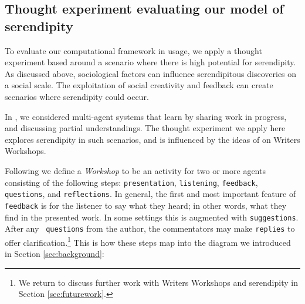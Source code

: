 \subsection{Thought experiment evaluating our model of serendipity} \label{sec:ww}

To evaluate our computational framework in usage, we apply a thought
experiment based around a scenario where there is high potential for
serendipity.  As discussed above, sociological factors can influence
serendipitous discoveries on a social scale.  The exploitation of
social creativity and feedback can create scenarios where serendipity
could occur.

In \cite{poetry-workshop}, we considered multi-agent systems that
learn by sharing work in progress, and discussing partial
understandings.  The thought experiment we apply here explores
serendipity in such scenarios, and is influenced by the ideas of
 on Writers Workshops.

Following 
we define a \emph{Workshop} to be an activity for two or more agents
consisting of the following steps:
{\tt presentation}, {\tt listening}, {\tt feedback}, {\tt questions},
and {\tt reflections}.  In general, the first and most important
feature of {\tt feedback} is for the listener to say what they heard;
in other words, what they find in the presented work.  In some
settings this is augmented with {\tt suggestions}.  After any {\tt
  questions} from the author, the commentators may make {\tt replies}
to offer clarification.\footnote{We return to discuss further work with Writers Workshops and serendipity in Section \ref{sec:futurework}.}
This is how these steps map into the diagram we introduced in Section \ref{sec:background}:


